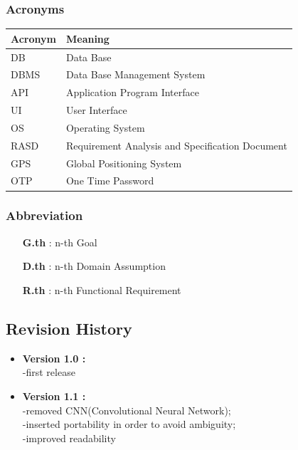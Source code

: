 \subsubsection{Acronyms}

\begin{tabular}{|l|l|}
    \hline
    Acronym & Meaning \\ \hline
    DB & Data Base \\ \hline
    DBMS & Data Base Management System \\ \hline
    API & Application Program Interface \\ \hline
    UI & User Interface \\ \hline
    OS & Operating System \\ \hline
    RASD & Requirement Analysis and Specification Document \\ \hline
    GPS & Global Positioning System \\ \hline
    OTP & One Time Password \\ 
    \hline
\end{tabular}

\subsubsection{Abbreviation}

\begin{itemize}
    \item [\textbf{G.th}]: n-th Goal
    \item [\textbf{D.th}]: n-th Domain Assumption
    \item [\textbf{R.th}]: n-th Functional Requirement
\end{itemize}

\subsection{Revision History}

\begin{itemize}
	\item\textbf{Version 1.0 :} \\	-first release
	\item\textbf{Version 1.1 :} \\	-removed CNN(Convolutional Neural Network);\\		-inserted portability in order to avoid ambiguity;\\	-improved readability
\end{itemize}

